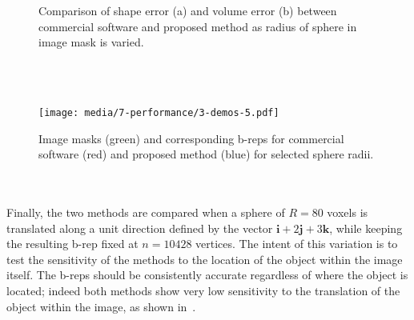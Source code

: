 \begin{figure}[ht!]
	\centering
	\caption{Comparison of shape error (a) and volume error (b) between commercial software and proposed method as radius of sphere in image mask is varied.}
	\label{fig:graph2}
\end{figure} \\ \\
\begin{figure}[ht!]
	\centering
	\texttt{[image: media/7-performance/3-demos-5.pdf]}
	\caption{Image masks (green) and corresponding b-reps for commercial software (red) and proposed method (blue) for selected sphere radii.}
	\label{fig:demos2}
\end{figure} \\ \\ 
%
Finally, the two methods are compared when a sphere of $R = 80$ voxels is translated along a unit direction defined by the vector $\bm{i}  + 2\bm{j} + 3\bm{k}$, while keeping the resulting b-rep fixed at $n = 10428$ vertices. The intent of this variation is to test the sensitivity of the methods to the location of the object within the image itself. The b-reps should be consistently accurate regardless of where the object is located; indeed both methods show very low sensitivity to the translation of the object within the image, as shown in~. \\ \\
